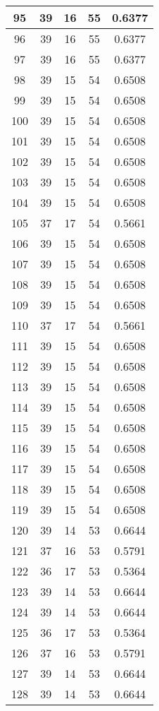 \documentclass[letterpaper, 12pt]{article}
\begin{document}
\begin{longtable}{|c|c|c|c|c|}
\hline
95 & 39 & 16 & 55 & 0.6377 \\
\hline
96 & 39 & 16 & 55 & 0.6377 \\
\hline
97 & 39 & 16 & 55 & 0.6377 \\
\hline
98 & 39 & 15 & 54 & 0.6508 \\
\hline
99 & 39 & 15 & 54 & 0.6508 \\
\hline
100 & 39 & 15 & 54 & 0.6508 \\
\hline
101 & 39 & 15 & 54 & 0.6508 \\
\hline
102 & 39 & 15 & 54 & 0.6508 \\
\hline
103 & 39 & 15 & 54 & 0.6508 \\
\hline
104 & 39 & 15 & 54 & 0.6508 \\
\hline
105 & 37 & 17 & 54 & 0.5661 \\
\hline
106 & 39 & 15 & 54 & 0.6508 \\
\hline
107 & 39 & 15 & 54 & 0.6508 \\
\hline
108 & 39 & 15 & 54 & 0.6508 \\
\hline
109 & 39 & 15 & 54 & 0.6508 \\
\hline
110 & 37 & 17 & 54 & 0.5661 \\
\hline
111 & 39 & 15 & 54 & 0.6508 \\
\hline
112 & 39 & 15 & 54 & 0.6508 \\
\hline
113 & 39 & 15 & 54 & 0.6508 \\
\hline
114 & 39 & 15 & 54 & 0.6508 \\
\hline
115 & 39 & 15 & 54 & 0.6508 \\
\hline
116 & 39 & 15 & 54 & 0.6508 \\
\hline
117 & 39 & 15 & 54 & 0.6508 \\
\hline
118 & 39 & 15 & 54 & 0.6508 \\
\hline
119 & 39 & 15 & 54 & 0.6508 \\
\hline
120 & 39 & 14 & 53 & 0.6644 \\
\hline
121 & 37 & 16 & 53 & 0.5791 \\
\hline
122 & 36 & 17 & 53 & 0.5364 \\
\hline
123 & 39 & 14 & 53 & 0.6644 \\
\hline
124 & 39 & 14 & 53 & 0.6644 \\
\hline
125 & 36 & 17 & 53 & 0.5364 \\
\hline
126 & 37 & 16 & 53 & 0.5791 \\
\hline
127 & 39 & 14 & 53 & 0.6644 \\
\hline
128 & 39 & 14 & 53 & 0.6644 \\

\end{longtable}
\end{document}
